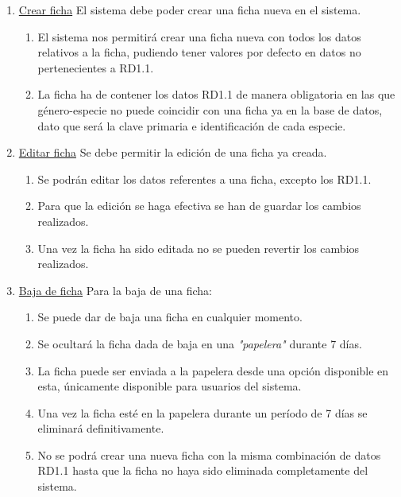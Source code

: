 \documentclass[10pt,a4paper]{article}
\begin{document}
\begin{enumerate}[label=RF\arabic*. ,leftmargin=2.8\parindent]
	\item \underline{Crear ficha}
	 \newline 
	 \newline
	El sistema debe poder crear una ficha nueva en el sistema.
	\begin{enumerate}[label=-]
	
		\item El sistema nos permitirá crear una ficha nueva con todos los datos relativos a la ficha, pudiendo tener valores por defecto en datos no pertenecientes a RD1.1.
		\item La ficha ha de contener los datos RD1.1 de manera obligatoria en las que género-especie no puede coincidir con una ficha ya en la base de datos, dato que será la clave primaria e identificación de cada especie.
		
	\end{enumerate}

	\bigskip
	\item \underline{Editar ficha}
	\newline \newline
	Se debe permitir la edición de una ficha ya creada.
	\begin{enumerate}[label=-]
		\item Se podrán editar los datos referentes a una ficha, excepto los RD1.1.
		\item Para que la edición se haga efectiva se han de guardar los cambios realizados.
		\item Una vez la ficha ha sido editada no se pueden revertir los cambios realizados.

		
	\end{enumerate}

	\bigskip
	\item \underline{Baja de ficha}
	\newline \newline
	Para la baja de una ficha:
	\begin{enumerate}[label=-]
		\item Se puede dar de baja una ficha en cualquier momento.
		\item Se ocultará la ficha dada de baja en una \textit{"papelera"} durante 7 días.
		\item La ficha puede ser enviada a la papelera desde una opción disponible en esta, únicamente disponible para usuarios del sistema.
		\item Una vez la ficha esté en la papelera durante un período de 7 días se eliminará definitivamente.
		\item No se podrá crear una nueva ficha con la misma combinación de datos RD1.1 hasta que la ficha no haya sido eliminada completamente del sistema.
	\end{enumerate}


\end{enumerate}
\end{document}
